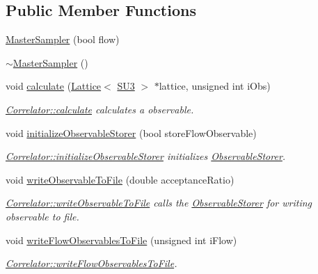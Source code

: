 \subsection*{Public Member Functions}
\begin{DoxyCompactItemize}
\item 
\mbox{\hyperlink{class_master_sampler_ac5ee503e8391aca36f73872a45bb6bd9}{Master\+Sampler}} (bool flow)
\item 
\mbox{\hyperlink{class_master_sampler_a040e460a888f8dc066de84563f83caa6}{$\sim$\+Master\+Sampler}} ()
\item 
void \mbox{\hyperlink{class_master_sampler_ad3cc7e36498dbf4a39238de3ac59ae8b}{calculate}} (\mbox{\hyperlink{class_lattice}{Lattice}}$<$ \mbox{\hyperlink{class_s_u3}{S\+U3}} $>$ $\ast$lattice, unsigned int i\+Obs)
\begin{DoxyCompactList}\small\item\em \mbox{\hyperlink{class_correlator_ab33502ff305f891c5c2e6d66a26a0247}{Correlator\+::calculate}} calculates a observable. \end{DoxyCompactList}\item 
void \mbox{\hyperlink{class_master_sampler_a88e2eec68ea6bd60cc3f375ac04a8ded}{initialize\+Observable\+Storer}} (bool store\+Flow\+Observable)
\begin{DoxyCompactList}\small\item\em \mbox{\hyperlink{class_correlator_ab99886c09dd27dfc8676d0032cecf9bc}{Correlator\+::initialize\+Observable\+Storer}} initializes \mbox{\hyperlink{class_observable_storer}{Observable\+Storer}}. \end{DoxyCompactList}\item 
void \mbox{\hyperlink{class_master_sampler_a638714c38e1a6252ab8b6be1fa224bd4}{write\+Observable\+To\+File}} (double acceptance\+Ratio)
\begin{DoxyCompactList}\small\item\em \mbox{\hyperlink{class_correlator_a9e8d80e30e4fbe3b7fe57521538cb5ff}{Correlator\+::write\+Observable\+To\+File}} calls the \mbox{\hyperlink{class_observable_storer}{Observable\+Storer}} for writing observable to file. \end{DoxyCompactList}\item 
void \mbox{\hyperlink{class_master_sampler_ad475928217ac61fae134128904aaa9f8}{write\+Flow\+Observables\+To\+File}} (unsigned int i\+Flow)
\begin{DoxyCompactList}\small\item\em \mbox{\hyperlink{class_correlator_a168512b2ce182d9478db47f100125fa6}{Correlator\+::write\+Flow\+Observables\+To\+File}}. \end{DoxyCompactList}\item 

\end{DoxyCompactItemize}
